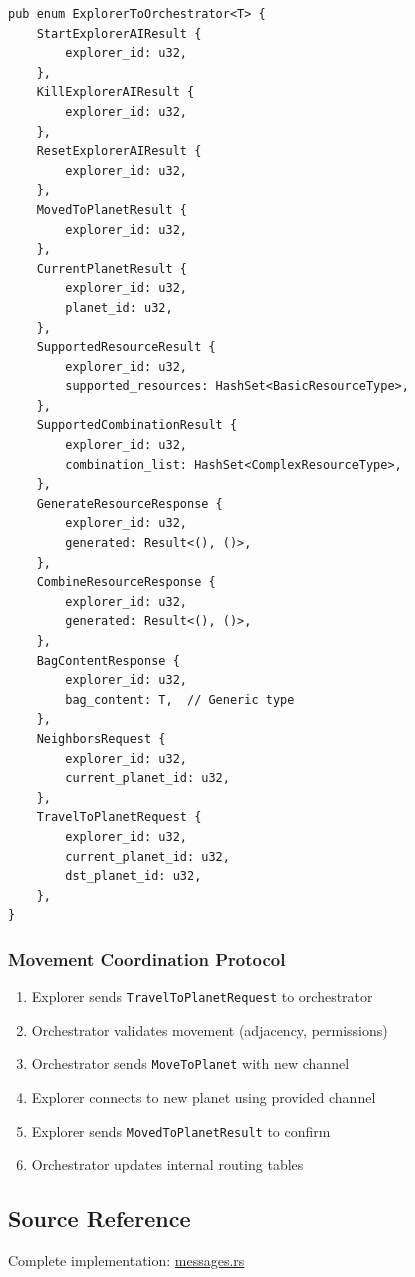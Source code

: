\documentclass[12pt,a4paper]{article}
\newcommand{\code}[1]{\texttt{\textcolor{secondary}{#1}}}
\begin{document}
\begin{lstlisting}[style=rustcool, caption={Explorer to Orchestrator Messages}, label=lst:explorer-to-orch]
pub enum ExplorerToOrchestrator<T> {
    StartExplorerAIResult {
        explorer_id: u32,
    },
    KillExplorerAIResult {
        explorer_id: u32,
    },
    ResetExplorerAIResult {
        explorer_id: u32,
    },
    MovedToPlanetResult {
        explorer_id: u32,
    },
    CurrentPlanetResult {
        explorer_id: u32,
        planet_id: u32,
    },
    SupportedResourceResult {
        explorer_id: u32,
        supported_resources: HashSet<BasicResourceType>,
    },
    SupportedCombinationResult {
        explorer_id: u32,
        combination_list: HashSet<ComplexResourceType>,
    },
    GenerateResourceResponse {
        explorer_id: u32,
        generated: Result<(), ()>,
    },
    CombineResourceResponse {
        explorer_id: u32,
        generated: Result<(), ()>,
    },
    BagContentResponse {
        explorer_id: u32,
        bag_content: T,  // Generic type
    },
    NeighborsRequest {
        explorer_id: u32,
        current_planet_id: u32,
    },
    TravelToPlanetRequest {
        explorer_id: u32,
        current_planet_id: u32,
        dst_planet_id: u32,
    },
}
\end{lstlisting}


\subsubsection{Movement Coordination Protocol}
\begin{enumerate}
    \item Explorer sends \code{TravelToPlanetRequest} to orchestrator
    \item Orchestrator validates movement (adjacency, permissions)
    \item Orchestrator sends \code{MoveToPlanet} with new channel
    \item Explorer connects to new planet using provided channel
    \item Explorer sends \code{MovedToPlanetResult} to confirm
    \item Orchestrator updates internal routing tables
\end{enumerate}

\subsection{Source Reference}
Complete implementation: \href{https://unitn-ap-2025.github.io/common-docs/src/common_game/protocols/messages.rs.html}{messages.rs}
\end{document}
